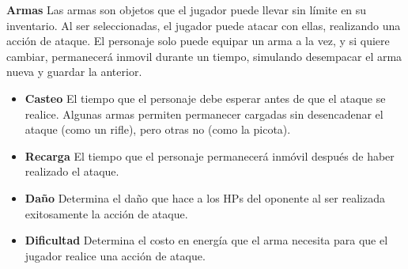 \item \textbf{Armas} \indispensable Las armas son objetos que el jugador puede llevar sin límite en su inventario. Al ser seleccionadas, el jugador puede atacar con ellas, realizando una acción de ataque. El personaje solo puede equipar un arma a la vez, y si quiere cambiar, permanecerá inmovil durante un tiempo, simulando desempacar el arma nueva y guardar la anterior.

  \begin{itemize}
  \item \textbf{Casteo} \talvez El tiempo que el personaje debe esperar antes de que el ataque se realice. Algunas armas permiten permanecer cargadas sin desencadenar el ataque (como un rifle), pero otras no (como la picota).

  \item \textbf{Recarga} \talvez El tiempo que el personaje permanecerá inmóvil después de haber realizado el ataque.

  \item \textbf{Daño} \indispensable Determina el daño que hace a los HPs del oponente al ser realizada exitosamente la acción de ataque.

  \item \textbf{Dificultad} \indispensable Determina el costo en energía que el arma necesita para que el jugador realice una acción de ataque.
  \end{itemize}
